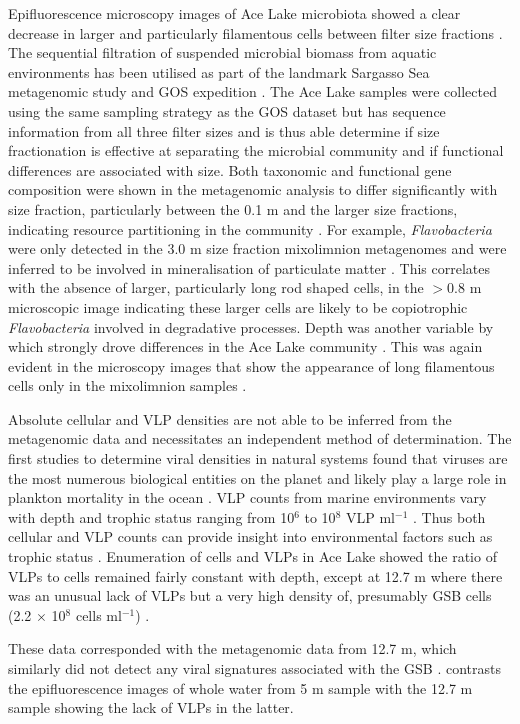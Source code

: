 Epifluorescence microscopy images of Ace Lake microbiota showed a clear decrease in larger and particularly filamentous cells between filter size fractions .
The sequential filtration of suspended microbial biomass from aquatic environments has been utilised as part of the landmark Sargasso Sea metagenomic study \cite{Venter2004} and \ac{GOS} expedition \cite{Rusch2007}.
The Ace Lake samples were collected using the same sampling strategy as the \ac{GOS} dataset but has sequence information from all three filter sizes and is thus able determine if size fractionation is effective at separating the microbial community and if functional differences are associated with size.
Both taxonomic and functional gene composition were shown in the metagenomic analysis to differ significantly with size fraction, particularly between the 0.1 \textmu{}m and the larger size fractions, indicating resource partitioning in the community \cite{Lauro2011}.
For example, \emph{Flavobacteria} were only detected in the 3.0 \textmu{}m size fraction mixolimnion metagenomes and were inferred to be involved in mineralisation of particulate matter \cite{Lauro2011}.
This correlates with the absence of larger, particularly long rod shaped cells, in the $>$0.8 \textmu{}m microscopic image  indicating these larger cells are likely to be copiotrophic \emph{Flavobacteria} involved in degradative processes.
Depth was another variable by which strongly drove differences in the Ace Lake community \cite{Lauro2011}.
This was again evident in the microscopy images that show the appearance of long filamentous cells only in the mixolimnion samples .

Absolute cellular and \ac{VLP} densities are not able to be inferred from the metagenomic data and necessitates an independent method of determination.
The first studies to determine viral densities in natural systems found that viruses are the most numerous biological entities on the planet and likely play a large role in plankton mortality in the ocean \cite{Bergh1989,Proctor1990}. 
\ac{VLP} counts from marine environments vary with depth and trophic status ranging from 10$^6$ to 10$^8$ \acs{VLP} ml$^{-1}$ \cite{Suttle2005}.
Thus both cellular and \ac{VLP} counts can provide insight into environmental factors such as trophic status \cite{Lauro2009}. 
Enumeration of cells and \acp{VLP} in Ace Lake showed the ratio of \acp{VLP} to cells remained fairly constant with depth, except at 12.7 m where there was an unusual lack of \acp{VLP} but a very high density of, presumably \ac{GSB} cells (2.2 $\times$ 10$^8$ cells ml$^{-1}$) .

These data corresponded with the metagenomic data from 12.7 m, which similarly did not detect any viral signatures associated with the \ac{GSB} \cite{Lauro2011}.
 contrasts the epifluorescence images of whole water from 5 m sample with the 12.7 m sample showing the lack of \acp{VLP} in the latter.



